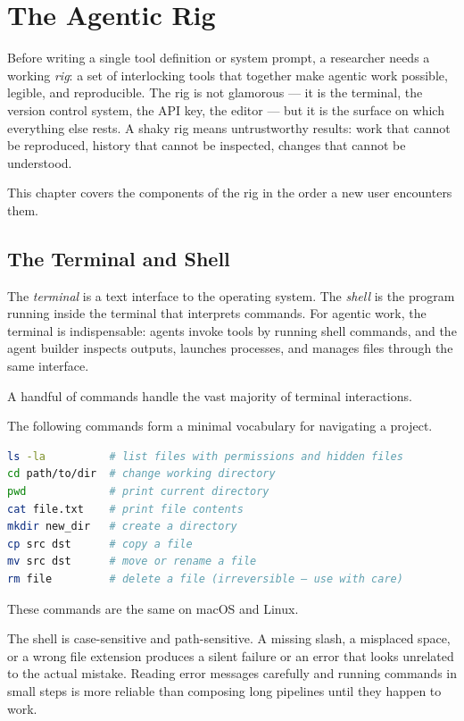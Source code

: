 \chapter{The Agentic Rig}
\label{chapter:AgenticRig}

Before writing a single tool definition or system prompt, a researcher needs a working \emph{rig}: a set of interlocking tools that together make agentic work possible, legible, and reproducible.
The rig is not glamorous — it is the terminal, the version control system, the API key, the editor — but it is the surface on which everything else rests.
A shaky rig means untrustworthy results: work that cannot be reproduced, history that cannot be inspected, changes that cannot be understood.

This chapter covers the components of the rig in the order a new user encounters them.

\section{The Terminal and Shell}
\label{section:Terminal}

The \emph{terminal} is a text interface to the operating system.
The \emph{shell} is the program running inside the terminal that interprets commands.
For agentic work, the terminal is indispensable: agents invoke tools by running shell commands, and the agent builder inspects outputs, launches processes, and manages files through the same interface.

A handful of commands handle the vast majority of terminal interactions.

\begin{example}
The following commands form a minimal vocabulary for navigating a project.
\begin{lstlisting}[language=bash]
ls -la          # list files with permissions and hidden files
cd path/to/dir  # change working directory
pwd             # print current directory
cat file.txt    # print file contents
mkdir new_dir   # create a directory
cp src dst      # copy a file
mv src dst      # move or rename a file
rm file         # delete a file (irreversible — use with care)
\end{lstlisting}
These commands are the same on macOS and Linux.
\end{example}

\begin{remark}
The shell is case-sensitive and path-sensitive.
A missing slash, a misplaced space, or a wrong file extension produces a silent failure or an error that looks unrelated to the actual mistake.
Reading error messages carefully and running commands in small steps is more reliable than composing long pipelines until they happen to work.
\end{remark}

